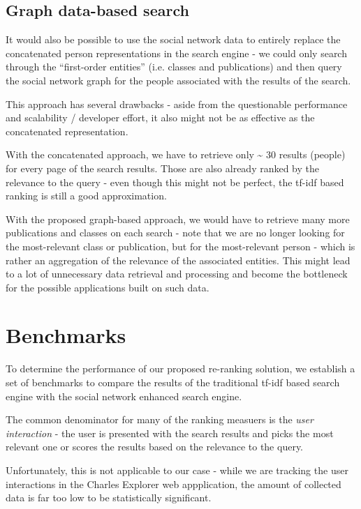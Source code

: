 \subsection{Graph data-based search} \label{graph-based-search}

It would also be possible to use the social network data to entirely replace the concatenated person representations in the search engine - we could 
only search through the ``first-order entities'' (i.e. classes and publications) and then query the social network graph for the people associated 
with the results of the search. 

This approach has several drawbacks - aside from the questionable performance and scalability / developer effort, it also might not be as effective as the concatenated representation.

With the concatenated approach, we have to retrieve only \textasciitilde{} 30 results (people) for every page of the search results. 
Those are also already ranked by the relevance to the query - even though this might not be perfect, the tf-idf based ranking is still a good approximation.

With the proposed graph-based approach, we would have to retrieve many more publications and classes on each search - note that we are no longer 
looking for the most-relevant class or publication, but for the most-relevant person - which is rather an aggregation of the relevance of the associated entities.
This might lead to a lot of unnecessary data retrieval and processing and become the bottleneck for the possible applications built on such data.


\section{Benchmarks}

To determine the performance of our proposed re-ranking solution, we establish a set of benchmarks to compare the results of the traditional tf-idf based search engine with the social network enhanced search engine.

The common denominator for many of the ranking measuers is the \textit{user interaction} - the user is presented with the search results and picks the most relevant one or scores the 
results based on the relevance to the query.

Unfortunately, this is not applicable to our case - while we are tracking the user interactions in the Charles Explorer web appplication, the amount of collected data is far too low to be statistically significant.

